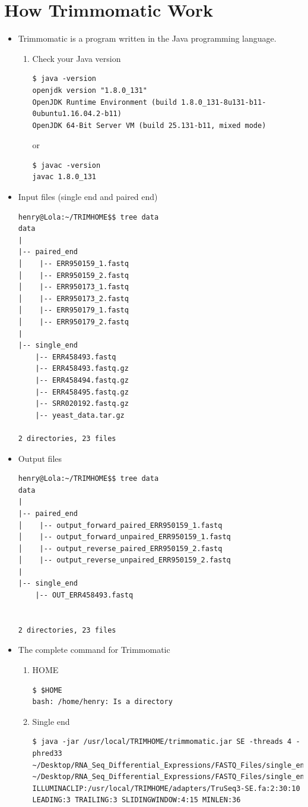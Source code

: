 \documentclass{article}
\begin{document}
\section{How Trimmomatic Work}
\begin{itemize}
\item Trimmomatic is a program written in the Java programming language. 
\begin{enumerate}
\item Check your Java version
\scriptsize  
\begin{verbatim}
$ java -version
openjdk version "1.8.0_131"
OpenJDK Runtime Environment (build 1.8.0_131-8u131-b11-0ubuntu1.16.04.2-b11)
OpenJDK 64-Bit Server VM (build 25.131-b11, mixed mode)
\end{verbatim}
\normalsize
or
\scriptsize  
\begin{verbatim}
$ javac -version
javac 1.8.0_131
\end{verbatim}
\normalsize
\end{enumerate}
\item Input files (single end and paired end)
 \tiny 
\begin{verbatim}
henry@Lola:~/TRIMHOME$$ tree data
data
|
|-- paired_end
│    |-- ERR950159_1.fastq
│    |-- ERR950159_2.fastq
│    |-- ERR950173_1.fastq
│    |-- ERR950173_2.fastq
│    |-- ERR950179_1.fastq
│    |-- ERR950179_2.fastq
|
|-- single_end
    |-- ERR458493.fastq
    |-- ERR458493.fastq.gz
    |-- ERR458494.fastq.gz
    |-- ERR458495.fastq.gz
    |-- SRR020192.fastq.gz
    |-- yeast_data.tar.gz

2 directories, 23 files
\end{verbatim}
\normalsize
\item Output files
 \tiny 
\begin{verbatim}
henry@Lola:~/TRIMHOME$$ tree data
data
|
|-- paired_end
│    |-- output_forward_paired_ERR950159_1.fastq
│    |-- output_forward_unpaired_ERR950159_1.fastq
│    |-- output_reverse_paired_ERR950159_2.fastq
│    |-- output_reverse_unpaired_ERR950159_2.fastq
|
|-- single_end
    |-- OUT_ERR458493.fastq


2 directories, 23 files
\end{verbatim}
\normalsize
\item The complete command for Trimmomatic
\begin{enumerate}
\item  HOME
\scriptsize  
\begin{verbatim}
$ $HOME
bash: /home/henry: Is a directory
\end{verbatim}
\normalsize
 \item Single end
 \tiny 
\begin{verbatim}
$ java -jar /usr/local/TRIMHOME/trimmomatic.jar SE -threads 4 -phred33  
~/Desktop/RNA_Seq_Differential_Expressions/FASTQ_Files/single_end/ERR458493.fastq
~/Desktop/RNA_Seq_Differential_Expressions/FASTQ_Files/single_end/OUT_ERR458493.fastq  
ILLUMINACLIP:/usr/local/TRIMHOME/adapters/TruSeq3-SE.fa:2:30:10 LEADING:3 TRAILING:3 SLIDINGWINDOW:4:15 MINLEN:36


\end{verbatim}
\end{enumerate}
\end{itemize}
\end{document}
